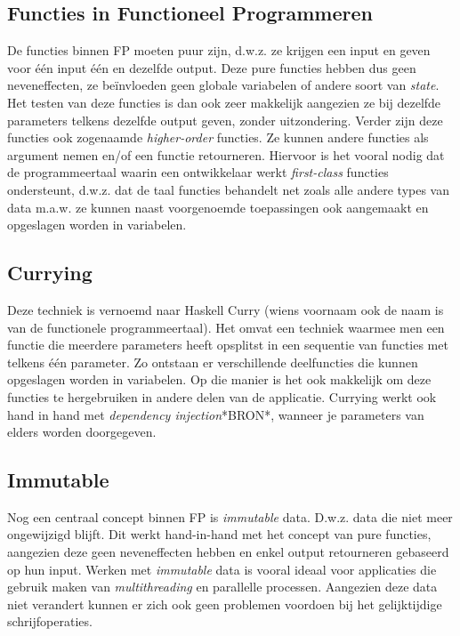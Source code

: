 \subsection{Functies in Functioneel Programmeren}
De functies binnen FP moeten puur zijn, d.w.z. ze krijgen een input en geven voor één input één en dezelfde output. Deze pure functies hebben dus geen neveneffecten, ze beïnvloeden geen globale variabelen of andere soort van \textit{state}. Het testen van deze functies is dan ook zeer makkelijk aangezien ze bij dezelfde parameters telkens dezelfde output geven, zonder uitzondering.
Verder zijn deze functies ook zogenaamde \textit{higher-order} functies. Ze kunnen andere functies als argument nemen en/of een functie retourneren.
Hiervoor is het vooral nodig dat de programmeertaal waarin een ontwikkelaar werkt \textit{first-class} functies ondersteunt, d.w.z. dat de taal functies behandelt net zoals alle andere types van data m.a.w. ze kunnen naast voorgenoemde toepassingen ook aangemaakt en opgeslagen worden in variabelen.

\subsection{Currying}
Deze techniek is vernoemd naar Haskell Curry (wiens voornaam ook de naam is van de functionele programmeertaal). Het omvat een techniek waarmee men een functie die meerdere parameters heeft opsplitst in een sequentie van functies met telkens één parameter. Zo ontstaan er verschillende deelfuncties die kunnen opgeslagen worden in variabelen. Op die manier is het ook makkelijk om deze functies te hergebruiken in andere delen van de applicatie. Currying werkt ook hand in hand met \textit{dependency injection}*BRON*, wanneer je parameters van elders worden doorgegeven.

\subsection{Immutable}
Nog een centraal concept binnen FP is \textit{immutable} data. D.w.z. data die niet meer ongewijzigd blijft. Dit werkt hand-in-hand met het concept van pure functies, aangezien deze geen neveneffecten hebben en enkel output retourneren gebaseerd op hun input. Werken met \textit{immutable} data is vooral ideaal voor applicaties die gebruik maken van \textit{multithreading} en parallelle processen. Aangezien deze data niet verandert kunnen er zich ook geen problemen voordoen bij het gelijktijdige schrijfoperaties.

